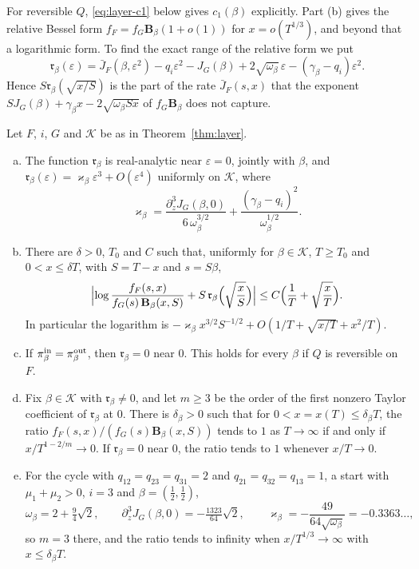 For reversible $Q$, \eqref{eq:layer-c1} below gives $c_1(\beta)$ explicitly. Part (b) gives
the relative Bessel form $f_F=f_G\mathbf B_\beta(1+o(1))$ for $x=o(T^{1/3})$, and beyond that a
logarithmic form. To find the exact range of the relative form we put
\[
\mathfrak r_\beta(\varepsilon)=\bar J_F(\beta,\varepsilon^2)-q_i\varepsilon^2-J_G(\beta)+2\sqrt{\omega_\beta}\,\varepsilon-(\gamma_\beta-q_i)\varepsilon^2 .
\]
Hence $S\mathfrak r_\beta(\sqrt{x/S})$ is the part of the rate $\bar J_F(s,x)$ that the exponent
$SJ_G(\beta)+\gamma_\beta x-2\sqrt{\omega_\beta Sx}$ of $f_G\mathbf B_\beta$ does not capture.

\begin{proposition}\label{prop:layer-cubic}
Let $F$, $i$, $G$ and $\mathcal K$ be as in Theorem~\ref{thm:layer}.
\begin{enumerate}[(a)]
\item The function $\mathfrak r_\beta$ is real-analytic near $\varepsilon=0$, jointly with $\beta$, and
$\mathfrak r_\beta(\varepsilon)=\varkappa_\beta\varepsilon^3+O(\varepsilon^4)$ uniformly on $\mathcal K$, where
\[
\varkappa_\beta=\frac{\partial_z^3J_G(\beta,0)}{6\,\omega_\beta^{3/2}}+\frac{(\gamma_\beta-q_i)^2}{\omega_\beta^{1/2}} .
\]
\item There are $\delta>0$, $T_0$ and $C$ such that, uniformly for $\beta\in\mathcal K$,
$T\ge T_0$ and $0<x\le\delta T$, with $S=T-x$ and $s=S\beta$,
\[
\Bigl|\log\frac{f_F(s,x)}{f_G(s)\,\mathbf B_\beta(x,S)}+S\,\mathfrak r_\beta\Bigl(\sqrt{\frac xS}\Bigr)\Bigr|
\le C\Bigl(\frac1T+\sqrt{\frac xT}\Bigr).
\]
In particular the logarithm is $-\varkappa_\beta x^{3/2}S^{-1/2}+O(1/T+\sqrt{x/T}+x^2/T)$.
\item If $\pi^{\rm in}_\beta=\pi^{\rm out}_\beta$, then $\mathfrak r_\beta=0$ near $0$. This holds for every
$\beta$ if $Q$ is reversible on $F$.
\item Fix $\beta\in\mathcal K$ with $\mathfrak r_\beta\ne0$, and let $m\ge3$ be the order of the first
nonzero Taylor coefficient of $\mathfrak r_\beta$ at $0$. There is $\delta_\beta>0$ such that for
$0<x=x(T)\le\delta_\beta T$, the ratio $f_F(s,x)/(f_G(s)\mathbf B_\beta(x,S))$ tends to $1$ as
$T\to\infty$ if and only if $x/T^{1-2/m}\to0$. If $\mathfrak r_\beta=0$ near $0$, the ratio tends to $1$
whenever $x/T\to0$.
\item For the cycle with $q_{12}=q_{23}=q_{31}=2$ and $q_{21}=q_{32}=q_{13}=1$, a start with
$\mu_1+\mu_2>0$, $i=3$ and $\beta=(\frac12,\frac12)$,
\[
\omega_\beta=2+\tfrac94\sqrt2,\qquad \partial_z^3J_G(\beta,0)=-\tfrac{1323}{64}\sqrt2,\qquad
\varkappa_\beta=-\frac{49}{64\sqrt{\omega_\beta}}=-0.3363\ldots,
\]
so $m=3$ there, and the ratio tends to infinity when $x/T^{1/3}\to\infty$ with
$x\le\delta_\beta T$.
\end{enumerate}
\end{proposition}

